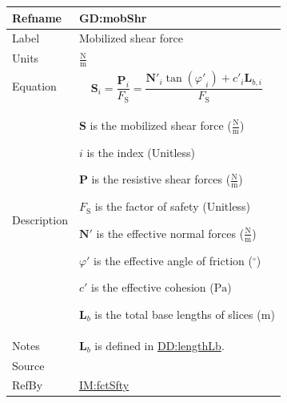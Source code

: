 \documentclass[12pt]{article}
\begin{document}
\medskip
\noindent
\begin{minipage}{\textwidth}
\begin{tabular}{>{\raggedright}p{}>{\raggedright\arraybackslash}p{}}
\toprule \textbf{Refname} & \textbf{GD:mobShr}
\label{GD:mobShr}
\\ \midrule
Label & Mobilized shear force
        
\\ \midrule
Units & $\frac{\text{N}}{\text{m}}$
        
\\ \midrule
Equation & \begin{displaymath}
           {\symbf{S}}_{i}=\frac{{\symbf{P}}_{i}}{{F_{\text{S}}}}=\frac{{\symbf{N'}}_{i} \tan\left({φ'}_{i}\right)+{c'}_{i} {\symbf{L}_{b,i}}}{{F_{\text{S}}}}
           \end{displaymath}
\\ \midrule
Description & \begin{symbDescription}
              \item{$\symbf{S}$ is the mobilized shear force ($\frac{\text{N}}{\text{m}}$)}
              \item{$i$ is the index (Unitless)}
              \item{$\symbf{P}$ is the resistive shear forces ($\frac{\text{N}}{\text{m}}$)}
              \item{${F_{\text{S}}}$ is the factor of safety (Unitless)}
              \item{$\symbf{N'}$ is the effective normal forces ($\frac{\text{N}}{\text{m}}$)}
              \item{$φ'$ is the effective angle of friction (${{}^{\circ}}$)}
              \item{$c'$ is the effective cohesion (${\text{Pa}}$)}
              \item{${\symbf{L}_{b}}$ is the total base lengths of slices (${\text{m}}$)}
              \end{symbDescription}
\\ \midrule
Notes & ${\symbf{L}_{b}}$ is defined in \hyperref[DD:lengthLb]{DD:lengthLb}.
        
\\ \midrule
Source & \cite{chen2005}
         
\\ \midrule
RefBy & \hyperref[IM:fctSfty]{IM:fctSfty}
        
\\ \bottomrule
\end{tabular}
\end{minipage}
\end{document}
